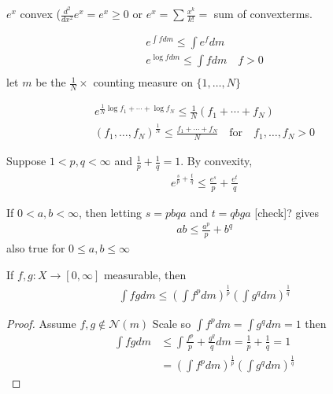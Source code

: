 \begin{example}
	$e^{x}$ convex
	($\frac{d^{2}}{dx^{2}} e^{x} = e^{x} \geq 0$ or $e^{x} = \sum \frac{x^{k}}{k!} =$ sum of convexterms.
\end{example}

\begin{align*}
	e^{\int f dm} \leq \int e^{f} dm \\
	e^{\log f dm} \leq \int f dm \quad f > 0 \\ 
\end{align*} let $m$ be the $\frac{1}{N} \times$ counting measure on $\{1, \ldots, N \}$ 

\begin{align*}
	e^{\frac{1}{N} \log f_{1} + \cdots + \log f_{N}} \leq \frac{1}{N} (f_{1} + \cdots + f_{N} ) \\
	(f_{1}, \ldots, f_{N})^{\frac{1}{N}} \leq \frac{f_{1} + \cdots + f_{N}}{N} \quad \text{for} \quad f_{1}, \ldots, f_{N} > 0
\end{align*} 

\begin{theorem}
	Suppose $1 < p,q < \infty$ and $\frac{1}{p} + \frac{1}{q} = 1$.
	By convexity,
	\begin{align*}
		e^{\frac{s}{p} + \frac{t}{q}} \leq \frac{e^{s}}{p} + \frac{e^{t}}{q}
	\end{align*} 
\end{theorem}

\begin{remark}
	If $0 < a,b < \infty$, then letting $s = pbqa$ and $t = qbga$ [check]?
	gives
	\begin{align*}
		ab \leq \frac{a^{p}}{p} + b^{q}
	\end{align*} also true for $0 \leq a,b \leq \infty$
\end{remark}

\begin{theorem}[Holder]
	If $f,g: X \to [0,\infty]$ measurable, then 
	 \begin{align*}
		\int fg dm \leq \left( \int f^{p} dm\right)^{\frac{1}{p}} \left( \int g^{q} dm\right)^{\frac{1}{q}}
	\end{align*} 
\end{theorem}

\begin{proof}
	Assume $f,g \notin \mathscr{N}(m)$
	Scale so $\int f^{p} dm = \int g^{q} dm = 1$ then
	\begin{align*}
		\int fg dm &\leq \int \frac{f^{p}}{p} + \frac{g^{q}}{q} dm = \frac{1}{p} + \frac{1}{q} = 1 \\
				   &= \left( \int f^{p} dm \right)^{\frac{1}{p}} \left( \int g^{q} dm\right)^{\frac{1}{q}}
	\end{align*} 
\end{proof}

